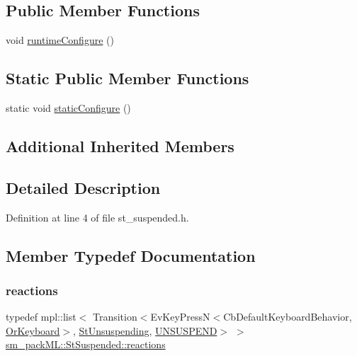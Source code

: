 \subsection*{Public Member Functions}
\begin{DoxyCompactItemize}
\item 
void \hyperlink{structsm__packML_1_1StSuspended_aa5fedfb9adb0495a7280376ea388e7dc}{runtime\+Configure} ()
\end{DoxyCompactItemize}
\subsection*{Static Public Member Functions}
\begin{DoxyCompactItemize}
\item 
static void \hyperlink{structsm__packML_1_1StSuspended_a0c51815b7d6c3b2eca298a7fe5f4b504}{static\+Configure} ()
\end{DoxyCompactItemize}
\subsection*{Additional Inherited Members}


\subsection{Detailed Description}


Definition at line 4 of file st\+\_\+suspended.\+h.



\subsection{Member Typedef Documentation}
\mbox{\label{structsm__packML_1_1StSuspended_a8bdc8aa52c97f3ac7a1bcfbe974a6f60}} 
\subsubsection{\texorpdfstring{reactions}{reactions}}
{\footnotesize\ttfamily typedef mpl\+::list$<$ Transition$<$Ev\+Key\+PressN$<$Cb\+Default\+Keyboard\+Behavior, \hyperlink{classsm__packML_1_1OrKeyboard}{Or\+Keyboard}$>$, \hyperlink{structsm__packML_1_1StUnsuspending}{St\+Unsuspending}, \hyperlink{structsm__packML_1_1StSuspended_1_1UNSUSPEND}{U\+N\+S\+U\+S\+P\+E\+ND}$>$ $>$ \hyperlink{structsm__packML_1_1StSuspended_a8bdc8aa52c97f3ac7a1bcfbe974a6f60}{sm\+\_\+pack\+M\+L\+::\+St\+Suspended\+::reactions}}



